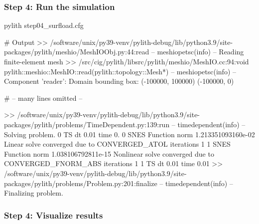 \documentclass[aspectratio=169]{beamer}
\begin{document}
\begin{frame}[fragile]
  \frametitle{Step 4: Run the simulation}
  \summary{}

\begin{bashcode}
pylith step04_surfload.cfg

# Output
 >> /software/unix/py39-venv/pylith-debug/lib/python3.9/site-packages/pylith/meshio/MeshIOObj.py:44:read
 -- meshiopetsc(info)
 -- Reading finite-element mesh
 >> /src/cig/pylith/libsrc/pylith/meshio/MeshIO.cc:94:void pylith::meshio::MeshIO::read(pylith::topology::Mesh*)
 -- meshiopetsc(info)
 -- Component 'reader': Domain bounding box:
    (-100000, 100000)
    (-100000, 0)

# -- many lines omitted --

 >> /software/unix/py39-venv/pylith-debug/lib/python3.9/site-packages/pylith/problems/TimeDependent.py:139:run
 -- timedependent(info)
 -- Solving problem.
0 TS dt 0.01 time 0.
    0 SNES Function norm 1.213351093160e-02
    Linear solve converged due to CONVERGED_ATOL iterations 1
    1 SNES Function norm 1.038106792811e-15
  Nonlinear solve converged due to CONVERGED_FNORM_ABS iterations 1
1 TS dt 0.01 time 0.01
 >> /software/unix/py39-venv/pylith-debug/lib/python3.9/site-packages/pylith/problems/Problem.py:201:finalize
 -- timedependent(info)
 -- Finalizing problem.
\end{bashcode}
  
\end{frame}


\begin{frame}
  \frametitle{Step 4: Visualize results}

    
\end{frame}


\end{document}
